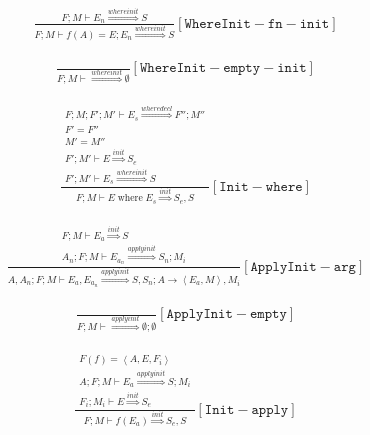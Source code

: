 \documentclass{scrartcl}
\DeclareMathOperator{\where}{where}
\begin{document}
    \begin{align*}
    \frac{
        F; M \vdash E_n \overset{whereinit}{\Rightarrow} S
    }{
        F; M \vdash f(A) = E; E_n \overset{whereinit}{\Rightarrow} S
    }[\mathtt{WhereInit-fn-init}]
    \end{align*}
    
    \begin{align*}
    \frac{}{
        F; M \vdash \overset{whereinit}{\Rightarrow} \emptyset
    }[\mathtt{WhereInit-empty-init}]
    \end{align*}
    
    \begin{align*}
    \frac{
        \begin{matrix}
        F; M; F'; M' \vdash E_s \overset{wheredecl}{\Rightarrow} F''; M'' \\
        F' = F'' \\
        M' = M'' \\
        F'; M' \vdash E \overset{init}{\Rightarrow} S_e \\
        F'; M' \vdash E_s \overset{whereinit}{\Rightarrow} S
        \end{matrix}
    }{
        F; M \vdash E \where E_s \overset{init}{\Rightarrow} S_e, S
    }[\mathtt{Init-where}]
    \end{align*}
    
    \begin{align*}
    \frac{
        \begin{matrix}
        F; M \vdash E_a \overset{init}{\Rightarrow} S \\
        A_n; F; M \vdash E_{a_n} \overset{applyinit}{\Rightarrow} S_n; M_i
        \end{matrix}
    }{
        A, A_n; F; M \vdash E_a, E_{a_n} \overset{applyinit}{\Rightarrow} S, S_n; A \to \left< E_a, M \right>, M_i
    }[\mathtt{ApplyInit-arg}]
    \end{align*}
    
    \begin{align*}
    \frac{}{
        F; M \vdash \overset{applyinit}{\Rightarrow} \emptyset; \emptyset
    }[\mathtt{ApplyInit-empty}]
    \end{align*}
    
    \begin{align*}
    \frac{
        \begin{matrix}
        F(f) = \left< A, E, F_i \right> \\
        A; F; M \vdash E_a \overset{applyinit}{\Rightarrow} S; M_i \\
        F_i; M_i \vdash E \overset{init}{\Rightarrow} S_e
        \end{matrix}
    }{
        F; M \vdash f(E_a) \overset{init}{\Rightarrow} S_e, S
    }[\mathtt{Init-apply}]
    \end{align*}
    
\end{document}
